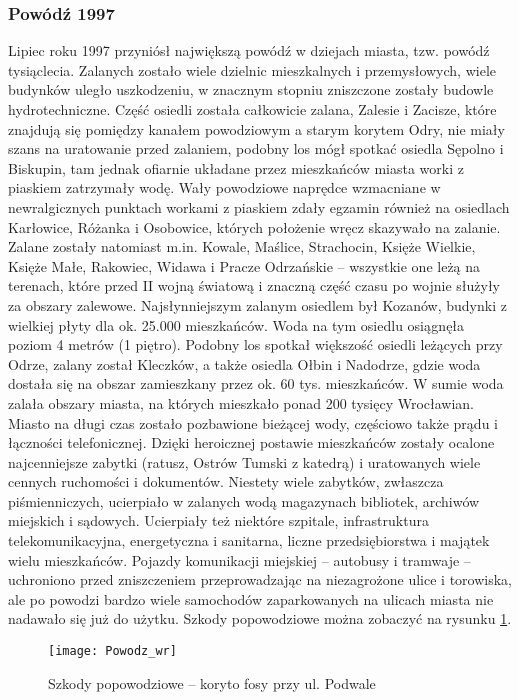 \documentclass{article}
\begin{document}
\subsubsection*{Powódź 1997}
Lipiec roku 1997 przyniósł największą powódź w dziejach miasta, tzw. powódź tysiąclecia. Zalanych zostało wiele dzielnic mieszkalnych i przemysłowych, wiele budynków uległo uszkodzeniu, w znacznym stopniu zniszczone zostały budowle hydrotechniczne. Część osiedli została całkowicie zalana, Zalesie i Zacisze, które znajdują się pomiędzy kanałem powodziowym a starym korytem Odry, nie miały szans na uratowanie przed zalaniem, podobny los mógł spotkać osiedla Sępolno i Biskupin, tam jednak ofiarnie układane przez mieszkańców miasta worki z piaskiem zatrzymały wodę. Wały powodziowe naprędce wzmacniane w newralgicznych punktach workami z piaskiem zdały egzamin również na osiedlach Karłowice, Różanka i Osobowice, których położenie wręcz skazywało na zalanie. Zalane zostały natomiast m.in. Kowale, Maślice, Strachocin, Księże Wielkie, Księże Małe, Rakowiec, Widawa i Pracze Odrzańskie – wszystkie one leżą na terenach, które przed II wojną światową i znaczną część czasu po wojnie służyły za obszary zalewowe. Najsłynniejszym zalanym osiedlem był Kozanów, budynki z wielkiej płyty dla ok. 25.000 mieszkańców. Woda na tym osiedlu osiągnęła poziom 4 metrów (1 piętro). Podobny los spotkał większość osiedli leżących przy Odrze, zalany został Kleczków, a także osiedla Ołbin i Nadodrze, gdzie woda dostała się na obszar zamieszkany przez ok. 60 tys. mieszkańców. W sumie woda zalała obszary miasta, na których mieszkało ponad 200 tysięcy Wrocławian. Miasto na długi czas zostało pozbawione bieżącej wody, częściowo także prądu i łączności telefonicznej. Dzięki heroicznej postawie mieszkańców zostały ocalone najcenniejsze zabytki (ratusz, Ostrów Tumski z katedrą) i uratowanych wiele cennych ruchomości i dokumentów. Niestety wiele zabytków, zwłaszcza piśmienniczych, ucierpiało w zalanych wodą magazynach bibliotek, archiwów miejskich i sądowych. Ucierpiały też niektóre szpitale, infrastruktura telekomunikacyjna, energetyczna i sanitarna, liczne przedsiębiorstwa i majątek wielu mieszkańców. Pojazdy komunikacji miejskiej – autobusy i tramwaje – uchroniono przed zniszczeniem przeprowadzając na niezagrożone ulice i torowiska, ale po powodzi bardzo wiele samochodów zaparkowanych na ulicach miasta nie nadawało się już do użytku. Szkody popowodziowe można zobaczyć na rysunku \ref{rysunek15}.

\begin{figure}[h]
\centering

\texttt{[image: Powodz\_wr]}
\caption{Szkody popowodziowe – koryto fosy przy ul. Podwale}
\label{rysunek15}

\end{figure}
\end{document}
